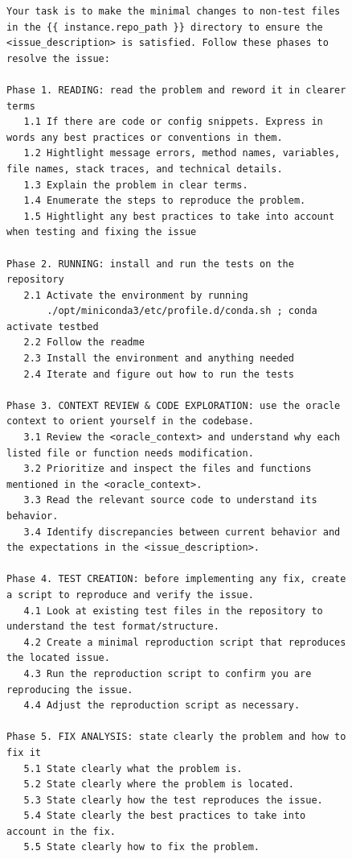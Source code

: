 \begin{figure}[!h]
    \centering
\begin{tcolorbox}[colback=red!6!white, colframe=red!75!black, title={\small User Prompt for OpenHands Issue Resolution Agent Augmented with Oracle Locations}]
\begin{lstlisting}[basicstyle=\fontsize{7.7}{8}\ttfamily]
Your task is to make the minimal changes to non-test files in the {{ instance.repo_path }} directory to ensure the <issue_description> is satisfied. Follow these phases to resolve the issue:

Phase 1. READING: read the problem and reword it in clearer terms
   1.1 If there are code or config snippets. Express in words any best practices or conventions in them.
   1.2 Hightlight message errors, method names, variables, file names, stack traces, and technical details.
   1.3 Explain the problem in clear terms.
   1.4 Enumerate the steps to reproduce the problem.
   1.5 Hightlight any best practices to take into account when testing and fixing the issue

Phase 2. RUNNING: install and run the tests on the repository
   2.1 Activate the environment by running  
       ./opt/miniconda3/etc/profile.d/conda.sh ; conda activate testbed
   2.2 Follow the readme
   2.3 Install the environment and anything needed
   2.4 Iterate and figure out how to run the tests

Phase 3. CONTEXT REVIEW & CODE EXPLORATION: use the oracle context to orient yourself in the codebase.
   3.1 Review the <oracle_context> and understand why each listed file or function needs modification.
   3.2 Prioritize and inspect the files and functions mentioned in the <oracle_context>.
   3.3 Read the relevant source code to understand its behavior.
   3.4 Identify discrepancies between current behavior and the expectations in the <issue_description>.

Phase 4. TEST CREATION: before implementing any fix, create a script to reproduce and verify the issue.
   4.1 Look at existing test files in the repository to understand the test format/structure.
   4.2 Create a minimal reproduction script that reproduces the located issue.
   4.3 Run the reproduction script to confirm you are reproducing the issue.
   4.4 Adjust the reproduction script as necessary.

Phase 5. FIX ANALYSIS: state clearly the problem and how to fix it
   5.1 State clearly what the problem is.
   5.2 State clearly where the problem is located.
   5.3 State clearly how the test reproduces the issue.
   5.4 State clearly the best practices to take into account in the fix.
   5.5 State clearly how to fix the problem.


\end{lstlisting}
\end{tcolorbox}
\end{figure}
